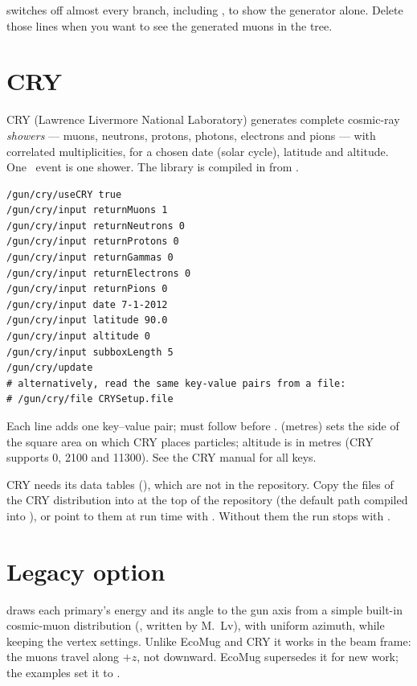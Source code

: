 \begin{checkbuild}
 switches off almost every branch, including , to show the generator alone. Delete those  lines when you want to see the generated muons in the tree.
\end{checkbuild}

\section{CRY}
CRY (Lawrence Livermore National Laboratory) generates complete cosmic-ray \emph{showers} --- muons, neutrons, protons, photons, electrons and pions --- with correlated multiplicities, for a chosen date (solar cycle), latitude and altitude. One \musrSim\ event is one shower. The library is compiled in from .

\begin{lstlisting}[style=mac,caption={CRY: muons only, sea level, \SI{5}{m} sub-box (from \texttt{run/CRYExample.mac})}]
/gun/cry/useCRY true
/gun/cry/input returnMuons 1
/gun/cry/input returnNeutrons 0
/gun/cry/input returnProtons 0
/gun/cry/input returnGammas 0
/gun/cry/input returnElectrons 0
/gun/cry/input returnPions 0
/gun/cry/input date 7-1-2012
/gun/cry/input latitude 90.0
/gun/cry/input altitude 0
/gun/cry/input subboxLength 5
/gun/cry/update
# alternatively, read the same key-value pairs from a file:
# /gun/cry/file CRYSetup.file
\end{lstlisting}

Each  line adds one key--value pair;  must follow before .  (metres) sets the side of the square area on which CRY places particles; altitude is in metres (CRY supports 0, 2100 and 11300). See the CRY manual for all keys.

\begin{pitfall}
CRY needs its data tables (), which are not in the repository. Copy the  files of the CRY distribution into  at the top of the repository (the default path compiled into \musrSim), or point to them at run time with . Without them the run stops with .
\end{pitfall}

\section{Legacy option}
 draws each primary's energy and its angle to the gun axis from a simple built-in cosmic-muon distribution (, written by M.~Lv), with uniform azimuth, while keeping the  vertex settings. Unlike EcoMug and CRY it works in the beam frame: the muons travel along \(+z\), not downward. EcoMug supersedes it for new work; the examples set it to .

